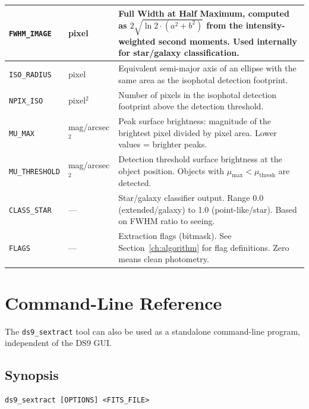 \documentclass[11pt,fleqn]{book}
\newcommand{\sextract}{\texttt{ds9\_sextract}}
\begin{document}
\begin{center}
\begin{longtable}{L{3.2cm} C{1.8cm} L{7.5cm}}
\texttt{FWHM\_IMAGE} & pixel & Full Width at Half Maximum, computed as $2\sqrt{\ln 2 \cdot (a^2 + b^2)}$ from the intensity-weighted second moments. Used internally for star/galaxy classification. \\
\midrule

\texttt{ISO\_RADIUS} & pixel & Equivalent semi-major axis of an ellipse with the same area as the isophotal detection footprint. \\
\midrule

\texttt{NPIX\_ISO} & pixel$^2$ & Number of pixels in the isophotal detection footprint above the detection threshold. \\
\midrule

\texttt{MU\_MAX} & mag/arcsec$^2$ & Peak surface brightness: magnitude of the brightest pixel divided by pixel area. Lower values = brighter peaks. \\
\midrule

\texttt{MU\_THRESHOLD} & mag/arcsec$^2$ & Detection threshold surface brightness at the object position. Objects with $\mu_{\max} < \mu_{\text{thresh}}$ are detected. \\
\midrule

\texttt{CLASS\_STAR} & --- & Star/galaxy classifier output. Range 0.0 (extended/galaxy) to 1.0 (point-like/star). Based on FWHM ratio to seeing. \\
\midrule

\texttt{FLAGS} & --- & Extraction flags (bitmask). See Section~\ref{ch:algorithm} for flag definitions. Zero means clean photometry. \\

\bottomrule
\end{longtable}
\end{center}


\chapter{Command-Line Reference}
\label{ch:cmdline}

The \sextract{} tool can also be used as a standalone command-line program, independent of the DS9 GUI.

\section{Synopsis}

\begin{codebox}
\begin{lstlisting}[style=bash,numbers=none]
ds9_sextract [OPTIONS] <FITS_FILE>
\end{lstlisting}
\end{codebox}
\end{document}
